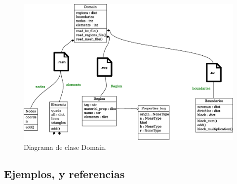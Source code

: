 \documentclass[xcolor=table,serif]{beamer}
\begin{document}
{{\begin{figure}
			\centering
			\includegraphics[scale=0.3]{classes_reduced_3.eps}
			\caption{Diagrama de clase Domain.}
			\end{figure}		
		}
	}
	\subsection{Ejemplos, y referencias}
\end{document}
